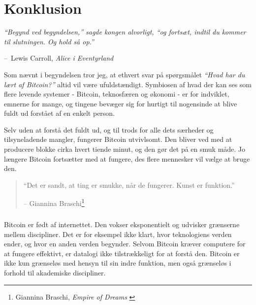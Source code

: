 \documentclass[paper=6in:9in,pagesize=pdftex,headinclude=on,footinclude=on,12pt]{scrbook}
\makeatletter
\newenvironment{chapquote}[2][4em]{\setlength{\@tempdima}{#1}%
   \def\chapquote@author{#2}%
   \parshape 1 \@tempdima \dimexpr\textwidth-2\@tempdima\relax%
   \itshape}{\par\normalfont\hfill--\ \chapquote@author\hspace*{\@tempdima}\par\bigskip}
\makeatother
\begin{document}
\label{ch:conclusion}

\chapter*{Konklusion}

\begin{chapquote}{Lewis Carroll, \textit{Alice i Eventyrland}} \enquote{Begynd ved begyndelsen,} sagde kongen alvorligt, \enquote{og fortsæt, indtil du kommer til slutningen. Og hold så op.} \end{chapquote}

Som nævnt i begyndelsen tror jeg, at ethvert svar på spørgsmålet \textit{\enquote{Hvad har du lært af Bitcoin?}} altid vil være ufuldstændigt. Symbiosen af hvad der kan ses som flere levende systemer - Bitcoin, teknosfæren og økonomi - er for indviklet, emnerne for mange, og tingene bevæger sig for hurtigt til nogensinde at blive fuldt ud forstået af en enkelt person.

Selv uden at forstå det fuldt ud, og til trods for alle dets særheder og tilsyneladende mangler, fungerer Bitcoin utvivlsomt. Den bliver ved med at producere blokke cirka hvert tiende minut, og den gør det på en smuk måde. Jo længere Bitcoin fortsætter med at fungere, des flere mennesker vil vælge at bruge den.\begin{quotation}\begin{samepage} \enquote{Det er sandt, at ting er smukke, når de fungerer. Kunst er funktion.} \begin{flushright} -- Giannina Braschi\footnote{Giannina Braschi, \textit{Empire of Dreams} \cite{braschi2011empire}}
\end{flushright}\end{samepage}\end{quotation}

\paragraph{} Bitcoin er født af internettet. Den vokser eksponentielt og udvisker grænserne mellem discipliner. Det er for eksempel ikke klart, hvor teknologiens verden ender, og hvor en anden verden begynder. Selvom Bitcoin kræver computere for at fungere effektivt, er datalogi ikke tilstrækkeligt for at forstå den. Bitcoin er ikke kun grænseløs med hensyn til sin indre funktion, men også grænseløs i forhold til akademiske discipliner.
\end{document}
